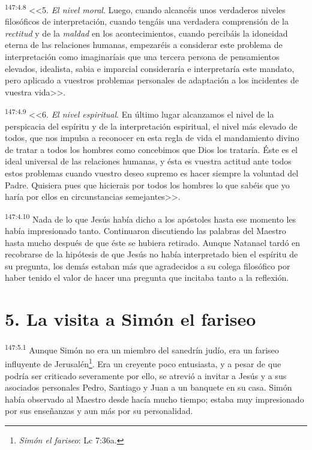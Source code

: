 \par 
\textsuperscript{147:4.8} <<5. \textit{El nivel moral}. Luego, cuando alcancéis unos verdaderos niveles filosóficos de interpretación, cuando tengáis una verdadera comprensión de la \textit{rectitud} y de la \textit{maldad} en los acontecimientos, cuando percibáis la idoneidad eterna de las relaciones humanas, empezaréis a considerar este problema de interpretación como imaginaríais que una tercera persona de pensamientos elevados, idealista, sabia e imparcial consideraría e interpretaría este mandato, pero aplicado a vuestros problemas personales de adaptación a los incidentes de vuestra vida>>.

\par 
\textsuperscript{147:4.9} <<6. \textit{El nivel espiritual}. En último lugar alcanzamos el nivel de la perspicacia del espíritu y de la interpretación espiritual, el nivel más elevado de todos, que nos impulsa a reconocer en esta regla de vida el mandamiento divino de tratar a todos los hombres como concebimos que Dios los trataría. Éste es el ideal universal de las relaciones humanas, y ésta es vuestra actitud ante todos estos problemas cuando vuestro deseo supremo es hacer siempre la voluntad del Padre. Quisiera pues que hicierais por todos los hombres lo que sabéis que yo haría por ellos en circunstancias semejantes>>.

\par 
\textsuperscript{147:4.10} Nada de lo que Jesús había dicho a los apóstoles hasta ese momento les había impresionado tanto. Continuaron discutiendo las palabras del Maestro hasta mucho después de que éste se hubiera retirado. Aunque Natanael tardó en recobrarse de la hipótesis de que Jesús no había interpretado bien el espíritu de su pregunta, los demás estaban más que agradecidos a su colega filosófico por haber tenido el valor de hacer una pregunta que incitaba tanto a la reflexión.

\section*{5. La visita a Simón el fariseo}
\par 
\textsuperscript{147:5.1} Aunque Simón no era un miembro del sanedrín judío, era un fariseo influyente de Jerusalén\footnote{\textit{Simón el fariseo}: Lc 7:36a.}. Era un creyente poco entusiasta, y a pesar de que podría ser criticado severamente por ello, se atrevió a invitar a Jesús y a sus asociados personales Pedro, Santiago y Juan a un banquete en su casa. Simón había observado al Maestro desde hacía mucho tiempo; estaba muy impresionado por sus enseñanzas y aun más por su personalidad.

